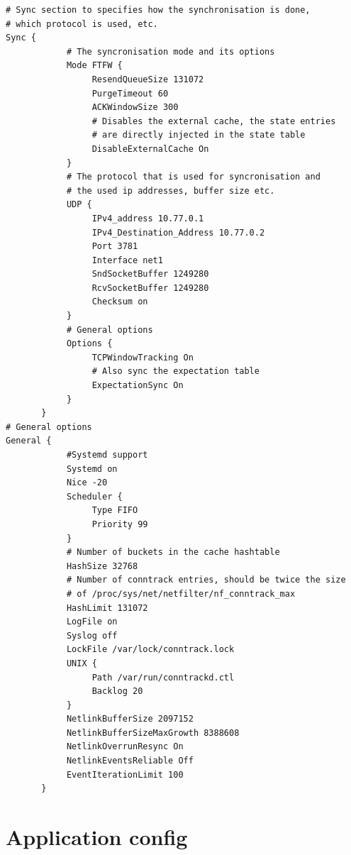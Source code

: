 \documentclass{report}
\begin{document}
\begingroup
\fontsize{9pt}{9pt}\selectfont
\begin{verbatim}
# Sync section to specifies how the synchronisation is done,
# which protocol is used, etc.
Sync {
            # The syncronisation mode and its options
            Mode FTFW {
                 ResendQueueSize 131072
                 PurgeTimeout 60
                 ACKWindowSize 300
                 # Disables the external cache, the state entries
                 # are directly injected in the state table
                 DisableExternalCache On
            }
            # The protocol that is used for syncronisation and
            # the used ip addresses, buffer size etc.
            UDP {
                 IPv4_address 10.77.0.1
                 IPv4_Destination_Address 10.77.0.2
                 Port 3781
                 Interface net1
                 SndSocketBuffer 1249280
                 RcvSocketBuffer 1249280
                 Checksum on
            }
            # General options
            Options {
                 TCPWindowTracking On
                 # Also sync the expectation table
                 ExpectationSync On
            }
       }
# General options
General {
            #Systemd support
            Systemd on
            Nice -20
            Scheduler {
                 Type FIFO
                 Priority 99
            }
            # Number of buckets in the cache hashtable
            HashSize 32768
            # Number of conntrack entries, should be twice the size
            # of /proc/sys/net/netfilter/nf_conntrack_max
            HashLimit 131072
            LogFile on
            Syslog off
            LockFile /var/lock/conntrack.lock
            UNIX {
                 Path /var/run/conntrackd.ctl
                 Backlog 20
            }
            NetlinkBufferSize 2097152
            NetlinkBufferSizeMaxGrowth 8388608
            NetlinkOverrunResync On
            NetlinkEventsReliable Off
            EventIterationLimit 100
       }
\end{verbatim}
\endgroup

\section{Application config}\label{celery-application}
\end{document}
